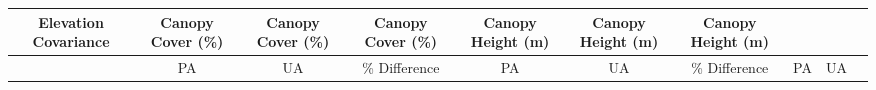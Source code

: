 \documentclass[11pt]{article}
\begin{document}
\begin{longtable}[]{@{}cccccccccc@{}}
\begin{minipage}[b]{0.08\columnwidth}
Elevation Covariance\strut
\end{minipage} & \begin{minipage}[b]{0.07\columnwidth}\centering
Canopy Cover (\%)\strut
\end{minipage} & \begin{minipage}[b]{0.07\columnwidth}\centering
Canopy Cover (\%)\strut
\end{minipage} & \begin{minipage}[b]{0.07\columnwidth}\centering
Canopy Cover (\%)\strut
\end{minipage} & \begin{minipage}[b]{0.08\columnwidth}\centering
Canopy Height (m)\strut
\end{minipage} & \begin{minipage}[b]{0.08\columnwidth}\centering
Canopy Height (m)\strut
\end{minipage} & \begin{minipage}[b]{0.08\columnwidth}\centering
Canopy Height (m)\strut
\end{minipage}\tabularnewline
\midrule
\endhead
\begin{minipage}[t]{0.04\columnwidth}\centering
\strut
\end{minipage} & \begin{minipage}[t]{0.08\columnwidth}\centering
PA\strut
\end{minipage} & \begin{minipage}[t]{0.08\columnwidth}\centering
UA\strut
\end{minipage} & \begin{minipage}[t]{0.08\columnwidth}\centering
\% Difference\strut
\end{minipage} & \begin{minipage}[t]{0.07\columnwidth}\centering
PA\strut
\end{minipage} & \begin{minipage}[t]{0.07\columnwidth}\centering
UA\strut
\end{minipage} & \begin{minipage}[t]{0.07\columnwidth}\centering
\% Difference\strut
\end{minipage} & \begin{minipage}[t]{0.08\columnwidth}\centering
PA\strut
\end{minipage} & \begin{minipage}[t]{0.08\columnwidth}\centering
UA\strut
\end{minipage} & \begin{minipage}[t]{0.08\columnwidth}\centering

\end{minipage}
\end{longtable}
\end{document}
